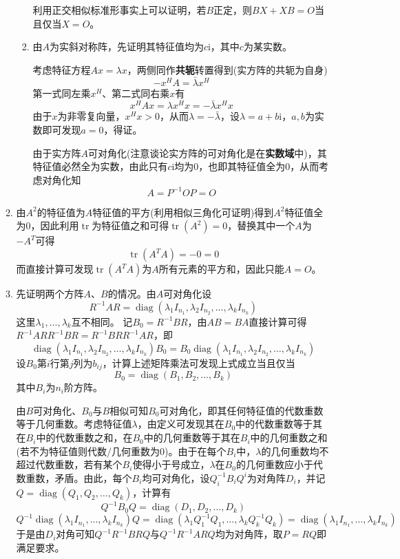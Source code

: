 \documentclass[a4paper,UTF8,fontset=windows]{ctexart}
\DeclareMathOperator{\diag}{diag}
\DeclareMathOperator{\tr}{tr}
\newcommand*{\ir}{\mathrm{i}}
\newcommand*{\note}{\noindent *}
\begin{document}
\begin{enumerate}
\begin{enumerate}
\begin{enumerate}
            \note 利用正交相似标准形事实上可以证明，若$B$正定，则$BX+XB=O$当且仅当$X=O$。

            \item 由$A$为实斜对称阵，先证明其特征值均为$c\ir$，其中$c$为某实数。
            
            考虑特征方程$Ax=\lambda x$，两侧同作\textbf{共轭}转置得到(实方阵的共轭为自身)
            $$-x^HA=\bar\lambda x^H$$
            第一式同左乘$x^H$、第二式同右乘$x$有
            $$x^HAx=\lambda x^Hx=-\bar\lambda x^Hx$$
            由于$x$为非零复向量，$x^Hx>0$，从而$\lambda=-\bar\lambda$，设$\lambda=a+b\ir$，$a,b$为实数即可发现$a=0$，得证。

            由于实方阵$A$可对角化(注意谈论实方阵的可对角化是在\textbf{实数域}中)，其特征值必然全为实数，由此只有$c\ir$均为0，也即其特征值全为0，从而考虑对角化知
            $$A=P^{-1}OP=O$$
        \end{enumerate}

        \item
        由$A^2$的特征值为$A$特征值的平方(利用相似三角化可证明)得到$A^2$特征值全为0，因此利用$\tr$为特征值之和可得$\tr(A^2)=0$，替换其中一个$A$为$-A^T$可得
        $$\tr(A^TA)=-0=0$$
        而直接计算可发现$\tr(A^TA)$为$A$所有元素的平方和，因此只能$A=O$。        

        \item
        先证明两个方阵$A$、$B$的情况。由$A$可对角化设
        $$R^{-1}AR=\diag(\lambda_1I_{n_1},\lambda_2I_{n_2},\dots,\lambda_kI_{n_k})$$
        这里$\lambda_1,\dots,\lambda_k$互不相同。
        记$B_0=R^{-1}BR$，由$AB=BA$直接计算可得$R^{-1}ARR^{-1}BR=R^{-1}BRR^{-1}AR$，即
        $$\diag(\lambda_1I_{n_1},\lambda_2I_{n_2},\dots,\lambda_kI_{n_k})B_0=B_0\diag(\lambda_1I_{n_1},\lambda_2I_{n_2},\dots,\lambda_kI_{n_k})$$
        设$B_0$第$i$行第$j$列为$b_{ij}$，计算上述矩阵乘法可发现上式成立当且仅当
        $$B_0=\diag(B_1,B_2,\dots,B_k)$$
        其中$B_i$为$n_i$阶方阵。

        由$B$可对角化、$B_0$与$B$相似可知$B_0$可对角化，即其任何特征值的代数重数等于几何重数。考虑特征值$\lambda$，由定义可发现其在$B_0$中的代数重数等于其在$B_i$中的代数重数之和，在$B_0$中的几何重数等于其在$B_i$中的几何重数之和(若不为特征值则代数/几何重数为0)。由于在每个$B_i$中，$\lambda$的几何重数均不超过代数重数，若有某个$B_i$使得小于号成立，$\lambda$在$B_0$的几何重数应小于代数重数，矛盾。由此，每个$B_i$均可对角化，设$Q_i^{-1}B_iQ^i$为对角阵$D_i$，并记$Q=\diag(Q_1,Q_2,\dots,Q_k)$，计算有
        $$Q^{-1}B_0Q=\diag(D_1,D_2,\dots,D_k)$$
        $$Q^{-1}\diag(\lambda_1I_{n_1},\dots,\lambda_kI_{n_k})Q=\diag(\lambda_1Q_1^{-1}Q_1,\dots,\lambda_kQ_k^{-1}Q_k)=\diag(\lambda_1I_{n_1},\dots,\lambda_kI_{n_k})$$
        于是由$D_i$对角可知$Q^{-1}R^{-1}BRQ$与$Q^{-1}R^{-1}ARQ$均为对角阵，取$P=RQ$即满足要求。


\end{enumerate}
\end{enumerate}
\end{document}
